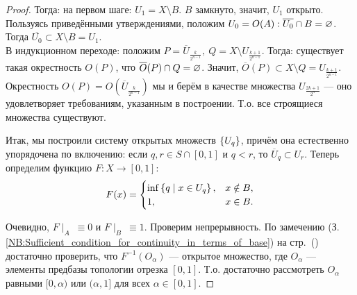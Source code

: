 \begin{proof}
            Тогда: на первом шаге: $U_1 = X \setminus B$. $B$ замкнуто, значит, $U_1$ открыто. Пользуясь приведёнными утверждениями, положим $U_0 = O(A): \overline{U_0} \cap B = \varnothing$. Тогда $\overline{U_0} \subset X \setminus B = U_1$.  \\
            В индукционном переходе: положим $P = \overline{U}_{\frac{k}{2^{n - 1}}}, \ Q = X \setminus U_{\frac{k + 1}{2^{n - 1}}}$. Тогда: существует такая окрестность $O(P)$, что $\overline{O}(P) \cap Q = \varnothing$. Значит, $\overline{O}(P) \subset X \setminus Q = U_{\frac{k+1}{2^{n-1}}}$. Окрестность $O(P) = O(\overline{U}_{\frac{k}{2^{n - 1}}})$ мы и берём в качестве множества $U_{\frac{2k+1}{2^{n}}}$ --- оно удовлетворяет требованиям, указанным в построении. Т.о. все строящиеся множества существуют.
            
            Итак, мы построили систему открытых множеств $\left\{U_q\right\}$, причём она естественно упорядочена по включению: если $q, r \in S \cap [0, 1]$ и $q < r$, то $\overline{U}_{q} \subset U_{r}$. Теперь определим функцию $F: X \to [0,1]$: \\

        \[
            F(x) = 
                \begin{cases}
                    \inf\left\{q \mid x \in U_q\right\}, & x \notin B, \\
                    1, & x \in B.
                \end{cases}
        \]

        Очевидно, $F\!\mid_{A} \ \equiv 0$ и $F\!\mid_{B} \ \equiv 1$.
        Проверим непрерывность. По замечению (З.\,\ref{NB:Sufficient_condition_for_continuity_in_terms_of_base}) на стр.~(\pageref{NB:Sufficient_condition_for_continuity_in_terms_of_base}) достаточно проверить, что $F^{-1}(O_\alpha)$ --- открытое множество, где $O_\alpha$ --- элементы предбазы топологии отрезка $[0, 1]$. Т.о. достаточно рассмотреть $O_{\alpha}$ равными $[0, \alpha)$ или $(\alpha, 1]$ для всех $\alpha \in [0,1]$. 


\end{proof}
